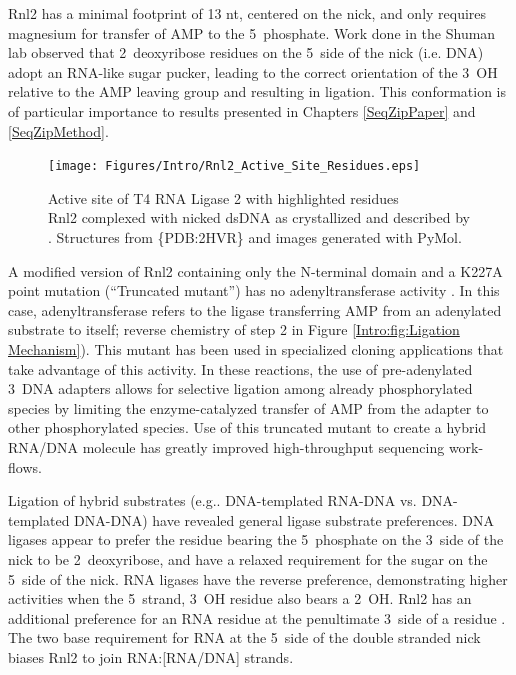     Rnl2 has a minimal footprint of 13 nt, centered on the nick, and only requires magnesium for transfer of AMP to the 5\textprime~phosphate. Work done in the Shuman lab \citep{Nandakumar2006} observed that 2\textprime~deoxyribose residues on the 5\textprime~side of the nick (i.e. DNA) adopt an RNA-like sugar pucker, leading to the correct orientation of the 3\textprime~OH relative to the AMP leaving group and resulting in ligation. This conformation is of particular importance to results presented in Chapters \ref{SeqZipPaper} and \ref{SeqZipMethod}.

    \begin{figure} %
      \centering
      \texttt{[image: Figures/Intro/Rnl2\_Active\_Site\_Residues.eps]}
      \caption[Active site of T4 RNA Ligase 2 with highlighted residues]
      {
        Active site of T4 RNA Ligase 2 with highlighted residues\\[0.25cm]
        Rnl2 complexed with nicked dsDNA as crystallized and described by \citep{Nandakumar2006}. Structures from \{PDB:2HVR\} and images generated with PyMol.
        }
      \label{Intro:fig:Rnl2 Active Site Residues}
      \end{figure}

    A modified version of Rnl2 containing only the N-terminal domain and a K227A point mutation (``Truncated mutant'') has no adenyltransferase activity \citep{Viollet2011}. In this case, adenyltransferase refers to the ligase transferring AMP from an adenylated substrate to itself; reverse chemistry of step 2 in Figure \ref{Intro:fig:Ligation Mechanism}). This mutant has been used in specialized cloning applications \citep{Ghildiyal2008, Hafner2008a, Viollet2011} that take advantage of this activity. In these reactions, the use of pre-adenylated 3\textprime~DNA adapters allows for selective ligation among already phosphorylated species by limiting the enzyme-catalyzed transfer of AMP from the adapter to other phosphorylated species. Use of this truncated mutant to create a hybrid RNA/DNA molecule has greatly improved high-throughput sequencing work-flows.

    Ligation of hybrid substrates (e.g.. DNA-templated RNA-DNA vs. DNA-templated DNA-DNA) have revealed general ligase substrate preferences. DNA ligases appear to prefer the residue bearing the 5\textprime~phosphate on the 3\textprime~side of the nick to be 2\textprime~deoxyribose, and have a relaxed requirement for the sugar on the 5\textprime~side of the nick. RNA ligases have the reverse preference, demonstrating higher activities when the 5\textprime~strand, 3\textprime~OH residue also bears a 2\textprime~OH. Rnl2 has an additional preference for an RNA residue at the penultimate 3\textprime~side of a residue \citep{Ho2002b,Ho2004, Nandakumar2004a, Nandakumar2006}. The two base requirement for RNA at the 5\textprime~side of the double stranded nick biases Rnl2 to join RNA:[RNA/DNA] strands.


